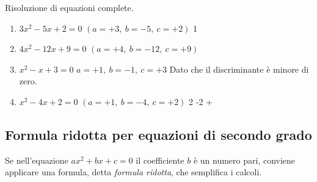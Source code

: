 
\begin{esempio}
Risoluzione di equazioni complete.
\begin{enumerate}
\item \(3x^2 -5x +2 = 0\) \quad \((a = +3,~b = -5,~c = +2)\) 
      {}{1}
\item \(4x^2 -12x +9 = 0\) \((a = +4,~b = -12,~c = +9)\)
            {}
\item \(x^2 -x +3=0\) \quad \(a = +1,~b = -1,~c = +3\)
            {}
Dato che il discriminante è minore di zero.
\item \(x^2 -4x +2 = 0\) \quad \((a = +1,~b = -4,~c = +2)\) 
      {2 -}{2 +}
\end{enumerate}
\end{esempio}



\subsection{Formula ridotta per equazioni di secondo grado}
Se nell'equazione
\(a x^2 +b x +c=0\) il coefficiente \(b\) è un numero pari, conviene 
applicare una formula, detta \emph{formula ridotta}, che semplifica i 
calcoli.

